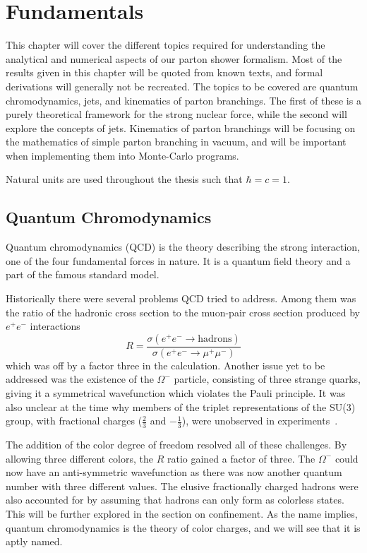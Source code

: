 \documentclass[main.tex]{subfiles}
\begin{document}
    
\chapter{Fundamentals}\label{cpt:fun}

This chapter will cover the different topics required for understanding the analytical and numerical aspects of our parton shower formalism. Most of the results given in this chapter will be quoted from known texts, and formal derivations will generally not be recreated. The topics to be covered are quantum chromodynamics, jets, and kinematics of parton branchings. The first of these is a purely theoretical framework for the strong nuclear force, while the second will explore the concepts of jets. Kinematics of parton branchings will be focusing on the mathematics of simple parton branching in vacuum, and will be important when implementing them into Monte-Carlo programs. 

Natural units are used throughout the thesis such that \(\hbar = c = 1\).

\section{Quantum Chromodynamics}\label{sec: QCD}
Quantum chromodynamics (QCD) is the theory describing the strong interaction, one of the four fundamental forces in nature. It is a quantum field theory and a part of the famous standard model.

Historically there were several problems QCD tried to address. Among them was the ratio of the hadronic cross section to the muon-pair cross section produced by \(e^+e^-\)  interactions 
\begin{equation}
    R = \frac{\sigma(e^+e^-\rightarrow\text{hadrons})}{\sigma(e^+e^- \rightarrow \mu^+\mu^-)}
\end{equation}
which was off by a factor three in the calculation. Another issue yet to be addressed was the existence of the \(\Omega^-\) particle, consisting of three strange quarks, giving it a symmetrical wavefunction which violates the Pauli principle. It was also unclear at the time why members of the triplet representations of the SU(3) group, with fractional charges (\(\frac{2}{3}\) and \(-\frac{1}{3}\)), were unobserved in experiments~\cite{CERN_courier_History_of_QCD}. 

The addition of the color degree of freedom resolved all of these challenges. By allowing three different colors, the \(R\) ratio gained a factor of three. The \(\Omega^-\) could now have an anti-symmetric wavefunction as there was now another quantum number with three different values. The elusive fractionally charged hadrons were also accounted for by assuming that hadrons can only form as colorless states. This will be further explored in the section on confinement. As the name implies, quantum chromodynamics is the theory of color charges, and we will see that it is aptly named.
\end{document}
